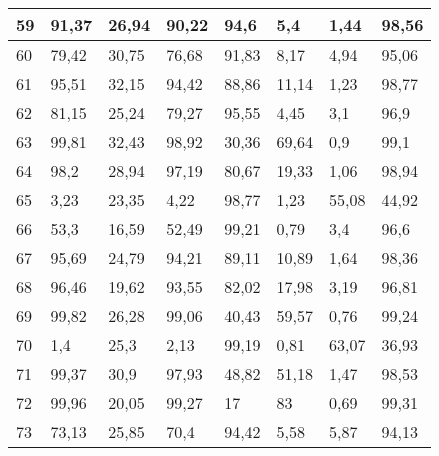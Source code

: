 \begin{longtable}[c]{|l|l|l|l|l|l|l|l|}
59              & 91,37        & 26,94        & 90,22       & 94,6          & 5,4           & 1,44          & 98,56         \\ \hline
60              & 79,42        & 30,75        & 76,68       & 91,83         & 8,17          & 4,94          & 95,06         \\ \hline
61              & 95,51        & 32,15        & 94,42       & 88,86         & 11,14         & 1,23          & 98,77         \\ \hline
62              & 81,15        & 25,24        & 79,27       & 95,55         & 4,45          & 3,1           & 96,9          \\ \hline
63              & 99,81        & 32,43        & 98,92       & 30,36         & 69,64         & 0,9           & 99,1          \\ \hline
64              & 98,2         & 28,94        & 97,19       & 80,67         & 19,33         & 1,06          & 98,94         \\ \hline
65              & 3,23         & 23,35        & 4,22        & 98,77         & 1,23          & 55,08         & 44,92         \\ \hline
66              & 53,3         & 16,59        & 52,49       & 99,21         & 0,79          & 3,4           & 96,6          \\ \hline
67              & 95,69        & 24,79        & 94,21       & 89,11         & 10,89         & 1,64          & 98,36         \\ \hline
68              & 96,46        & 19,62        & 93,55       & 82,02         & 17,98         & 3,19          & 96,81         \\ \hline
69              & 99,82        & 26,28        & 99,06       & 40,43         & 59,57         & 0,76          & 99,24         \\ \hline
70              & 1,4          & 25,3         & 2,13        & 99,19         & 0,81          & 63,07         & 36,93         \\ \hline
71              & 99,37        & 30,9         & 97,93       & 48,82         & 51,18         & 1,47          & 98,53         \\ \hline
72              & 99,96        & 20,05        & 99,27       & 17            & 83            & 0,69          & 99,31         \\ \hline
73              & 73,13        & 25,85        & 70,4        & 94,42         & 5,58          & 5,87          & 94,13         \\ \hline

\end{longtable}

